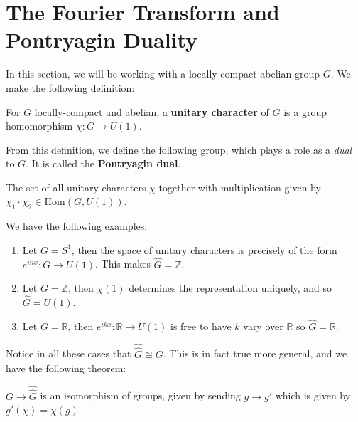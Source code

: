 \section{The Fourier Transform and Pontryagin Duality} %
\label{sec:the_fourier_transform_and_pontryagin_duality}
		
		In this section, we will be working with a locally-compact abelian group $G$. We make the following definition:
		\begin{defn}
			For $G$ locally-compact and abelian, a \textbf{unitary character} of $G$ is a group homomorphism $\chi: G \to U(1)$.
		\end{defn}
		From this definition, we define the following group, which plays a role as a \emph{dual} to $G$. It is called the \textbf{Pontryagin dual}.
		\begin{defn}
			The set of all unitary characters $\chi$ together with multiplication given by $\chi_1 \cdot \chi_2 \in \mathrm{Hom}(G, U(1))$.
		\end{defn}
		
		\begin{eg}
			We have the following examples:
			\begin{enumerate}
				\item Let $G = S^1$, then the space of unitary characters is precisely of the form $e^{inx}: G \to U(1)$. This makes $\widehat G = \mathbb Z$.
				\item Let $G = \mathbb Z$, then $\chi(1)$ determines the representation uniquely, and so $\widehat G = U(1)$.
				\item 			Let $G = \mathbb R$, then $e^{ikx} : \mathbb R \to U(1)$ is free to have $k$ vary over $\mathbb R$ so $\widehat G = \mathbb R$.
			\end{enumerate}
			
		\end{eg}

		Notice in all these cases that $\widehat{\widehat G} \cong G$. This is in fact true more general, and we have the following theorem:
		\begin{theorem}
			$G \to \widehat{\widehat G}$ is an isomorphism of groups, given by sending $g \to  g'$ which is given by $g' (\chi) = \chi (g)$.
		\end{theorem}
		
